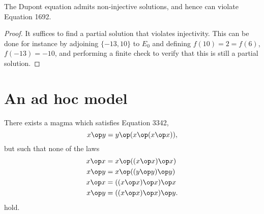\begin{corollary}\label{non-inject}\leanok{} The Dupont equation admits non-injective solutions, and hence can violate Equation 1692.
\end{corollary}

\begin{proof} It suffices to find a partial solution that violates injectivity.  This can be done for instance by adjoining $\{-13, 10\}$ to $E_0$ and defining $f(10)= 2 = f(6)$, $f(-13)=-10$, and performing a finite check to verify that this is still a partial solution.
\end{proof}

\section{An ad hoc model}\label{adhoc-model}

\begin{theorem}  There exists a magma which satisfies Equation 3342,
$$ x \op y = y \op (x \op (x \op x)),$$
but such that none of the laws
\begin{align*}
  x \op x &= x \op ((x \op x) \op x) \\
  x \op y &= x \op ((y \op y) \op y) \\
  x \op x &= ((x \op x) \op x) \op x \\
  x \op y &= ((x \op x) \op x) \op y.
\end{align*}
hold.
\end{theorem}

